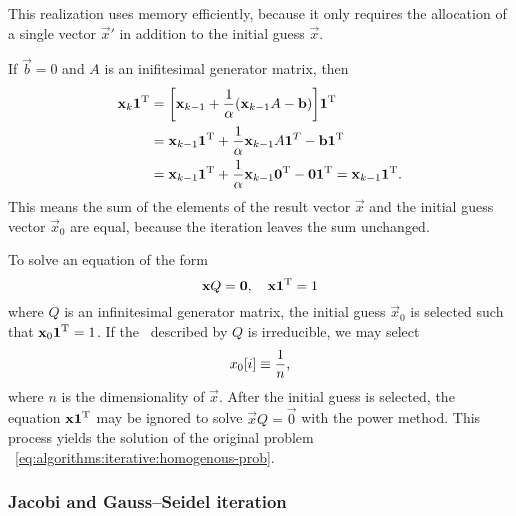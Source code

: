 This realization uses memory efficiently, because it only requires the
allocation of a single vector $\vec{x}'$ in addition to the initial
guess $\vec{x}$.

\begin{obs}
  \label{obs:algorithms:iterative:power-keepnorm}
  If $\vec{b} = 0$ and $A$ is an inifitesimal generator matrix, then
  \begin{align}
    \vec{x}_k \vec{1}^\T &= \mleft[ \vec{x}_{k - 1} + \frac{1}{\alpha}
                           \mleft( \vec{x}_{k - 1} A - \vec{b}
                           \mright) \mright] \vec{1}^\T \\
                         &= \vec{x}_{k - 1} \vec{1}^\T +
                           \frac{1}{\alpha} \vec{x}_{k - 1} A
                           \vec{1}^T - \vec{b} \vec{1}^\T \\
                         &= \vec{x}_{k - 1} \vec{1}^\T +
                           \frac{1}{\alpha} \vec{x}_{k - 1} \vec{0}^\T
                           - \vec{0} \vec{1}^\T = \vec{x}_{k - 1} \vec{1}^\T.
  \end{align}
  This means the sum of the elements of the result vector $\vec{x}$
  and the initial guess vector $\vec{x}_0$ are equal, because the
  iteration leaves the sum unchanged.
\end{obs}

To solve an equation of the form
\begin{equation}
  \label{eq:algorithms:iterative:homogenous-prob}
  \bm{\mathrm{x}} Q = \bm{\mathrm{0}},\quad \bm{\mathrm{x}} \bm{\mathrm{1}}^{\mathrm{T}} = 1
\end{equation}
where $Q$ is an infinitesimal generator matrix, the initial guess
$\vec{x}_0$ is selected such that $\bm{\mathrm{x}}_0 \bm{\mathrm{1}}^{\mathrm{T}} = 1$. If the
\CTMC\ described by $Q$ is irreducible, we may select
\begin{equation}
  \label{eq:algorithms:iterative:power-init}
  x_0[i] \equiv \frac{1}{n} \text,
\end{equation}
where $n$ is the dimensionality of $\vec{x}$. After the initial guess
is selected, the equation $\bm{\mathrm{x}} \bm{\mathrm{1}}^{\mathrm{T}}$ may be ignored to solve
$\vec{x} Q = \vec{0}$ with the power method. This process yields the
solution of the original problem%
~\eqref{eq:algorithms:iterative:homogenous-prob}.

\subsubsection{Jacobi and Gauss--Seidel iteration}
\label{ssec:algorithms:jgs}

